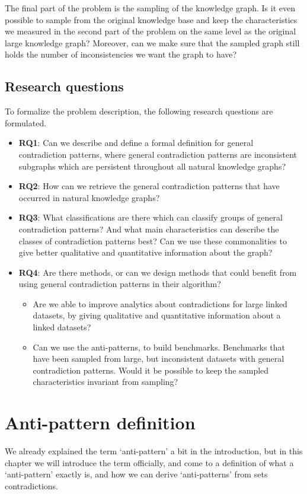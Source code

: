 \documentclass[11pt,letterpaper ,oneside ]{book}
\begin{document}
The final part of the problem is the sampling of the knowledge graph. Is it even possible to sample from the original knowledge base and keep the characteristics we measured in the second part of the problem on the same level as the original large knowledge graph? Moreover, can we make sure that the sampled graph still holds the number of inconsistencies we want the graph to have? 

\subsection{Research questions}
To formalize the problem description, the following research questions are formulated.
\begin{itemize}
	\item \textbf{RQ1}: Can we describe and define a formal definition for general contradiction patterns, where general contradiction patterns are inconsistent subgraphs which are persistent throughout all natural knowledge graphs?
	\item \textbf{RQ2}: How can we retrieve the general contradiction patterns that have occurred in natural knowledge graphs? 
	\item \textbf{RQ3}: What classifications are there which can classify groups of general contradiction patterns? And what main characteristics can describe the classes of contradiction patterns best? Can we use these commonalities to give better qualitative and quantitative information about the graph?
	\item \textbf{RQ4}: Are there methods, or can we design methods that could benefit from using general contradiction patterns in their algorithm? 
	\begin{itemize}
		\item Are we able to improve analytics about contradictions for large linked datasets, by giving qualitative and quantitative information about a linked datasets?
		\item Can we use the anti-patterns, to build benchmarks. Benchmarks that have been sampled from large, but inconsistent datasets with general contradiction patterns. Would it be possible to keep the sampled characteristics invariant from sampling?
	\end{itemize}
\end{itemize}

\section{Anti-pattern definition}\label{AntiPatternDefinition}
 We already explained the term  `anti-pattern' a bit in the introduction, but in this chapter we will introduce the term officially, and come to a definition of what a `anti-pattern' exactly is, and how we can derive `anti-patterns' from sets contradictions. \\
\end{document}
